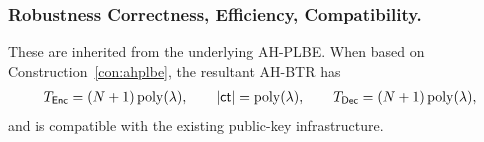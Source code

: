 \subsubsection{Robustness Correctness, Efficiency, Compatibility.}
These are inherited from the underlying AH-PLBE.
When based on Construction~\ref{con:ahplbe},
the resultant AH-BTR has
\begin{align*}
T_{\smash{\mathsf{Enc}}}=(N+1)\operatorname{poly}(\lambda),\qquad
|{\smash{\mathsf{ct}}}|=\operatorname{poly}(\lambda),\qquad
T_{\smash{\mathsf{Dec}}}=(N+1)\operatorname{poly}(\lambda),
\end{align*}
and is compatible with the existing public-key infrastructure.
